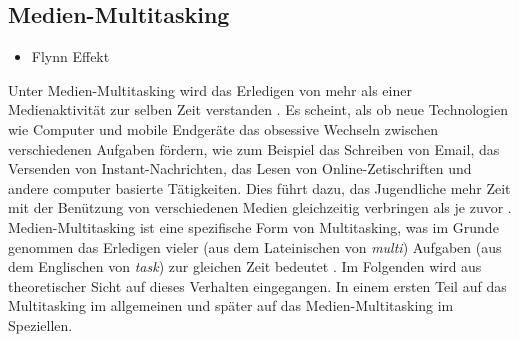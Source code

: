 \subsection{Medien-Multitasking}\label{subsection.medienMultitasking}
\begin{itemize}
    \item Flynn Effekt
\end{itemize}
Unter Medien-Multitasking wird das Erledigen von mehr als einer Medienaktivität zur selben Zeit verstanden \cite{Foehr2006}. Es scheint, als ob neue Technologien wie Computer und mobile Endgeräte das obsessive Wechseln zwischen verschiedenen Aufgaben fördern, wie zum Beispiel das Schreiben von Email, das Versenden von Instant-Nachrichten, das Lesen von Online-Zetischriften und andere computer basierte Tätigkeiten. Dies führt dazu, das Jugendliche mehr Zeit mit der Benützung von verschiedenen Medien gleichzeitig verbringen als je zuvor \cite{Kaiser2004}. \\
Medien-Multitasking ist eine spezifische Form von Multitasking, was im Grunde genommen das Erledigen vieler (aus dem Lateinischen von \textit{multi}) Aufgaben (aus dem Englischen von \textit{task}) zur gleichen Zeit bedeutet \cite{Spitzer2012}. Im Folgenden wird aus theoretischer Sicht auf dieses Verhalten eingegangen. In einem ersten Teil auf das Multitasking im allgemeinen und später auf das Medien-Multitasking im Speziellen.\\
